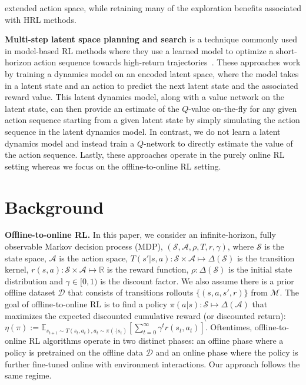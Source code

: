 extended action space, while retaining many of the exploration benefits associated with HRL methods.

\textbf{Multi-step latent space planning and search} is a technique commonly used in model-based RL methods where they use a learned model to optimize a short-horizon action sequence towards high-return trajectories~\citep{oh2017value, schrittwieser2020mastering}. 
These approaches work by training a dynamics model on an encoded latent space, where the model takes in a latent state and an action to predict the next latent state and the associated reward value. This latent dynamics model, along with a value network on the latent state, can then provide an estimate of the $Q$-value on-the-fly for any given action sequence starting from a given latent state by simply simulating the action sequence in the latent dynamics model. In contrast, we do not learn a latent dynamics model and instead train a $Q$-network to directly estimate the value of the action sequence.
Lastly, these approaches operate in the purely online RL setting whereas we focus on the offline-to-online RL setting.




\section{Background}
\label{sec:preliminary}
\textbf{Offline-to-online RL.} In this paper, we consider an infinite-horizon, fully observable Markov decision process (MDP), $(\mathcal{S}, \mathcal{A}, \rho, T, r, \gamma)$, where $\mathcal{S}$ is the state space, $\mathcal{A}$ is the action space, $T(s'|s, a): \mathcal{S} \times \mathcal{A} \mapsto \Delta(\mathcal{S})$ is the transition kernel, $r(s, a): \mathcal{S}\times \mathcal{A}\mapsto \mathbb{R}$ is the reward function, $\rho: \Delta(\mathcal{S})$ is the initial state distribution and $\gamma \in [0, 1)$ is the discount factor. We also assume there is a prior offline dataset $\mathcal{D}$ that consists of transitions rollouts $\{(s, a, s', r)\}$ from $\mathcal{M}$. The goal of offline-to-online RL is to find a policy $\pi(a | s): \mathcal{S} \mapsto \Delta(\mathcal{A})$ that maximizes the expected discounted cumulative reward (or discounted return): $\eta(\pi) := \mathbb{E}_{s_{t+1} \sim T(s_t, a_t), a_t \sim \pi(\cdot | s_{t})}\left[\sum_{t=0}^{\infty} \gamma^t r(s_t, a_t)\right]$.
Oftentimes, offline-to-online RL algorithms operate in two distinct phases: an offline phase where a policy is pretrained on the offline data $\mathcal{D}$ and an online phase where the policy is further fine-tuned online with environment interactions. Our approach follows the same regime.




